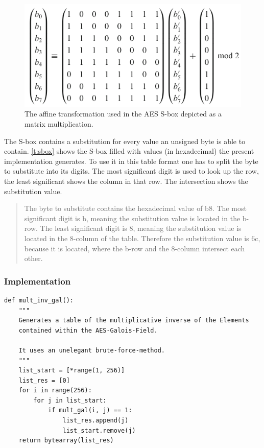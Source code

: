 \begin{figure}
\centering
\includegraphics[scale = 0.3]{data/figures/affinetrans.png} 
\caption{The affine transformation used in the AES S-box depicted as a matrix multiplication.}
\end{figure}

The S-box contains a substitution for every value an unsigned byte is
able to contain. \ref{t:sbox} shows the S-box filled with values (in
hexadecimal) the present implementation generates. To use it in this
table format one has to split the byte to substitute into its digits.
The most significant digit is used to look up the row, the least
significant shows the column in that row. The intersection shows the
substitution value.

\begin{quote}
The byte to substitute contains the hexadecimal value of b8. The most
significant digit is b, meaning the substitution value is located in the
b-row. The least significant digit is 8, meaning the substitution value
is located in the 8-column of the table. Therefore the substitution
value is 6c, because it is located, where the b-row and the 8-column
intersect each other.
\end{quote}

\hypertarget{implementation-1}{%
\subsubsection{Implementation}\label{implementation-1}}

\begin{lstlisting}
def mult_inv_gal():
    """
    Generates a table of the multiplicative inverse of the Elements
    contained within the AES-Galois-Field.

    It uses an unelegant brute-force-method.
    """
    list_start = [*range(1, 256)]
    list_res = [0]
    for i in range(256):
        for j in list_start:
            if mult_gal(i, j) == 1:
                list_res.append(j)
                list_start.remove(j)
    return bytearray(list_res)
\end{lstlisting}

